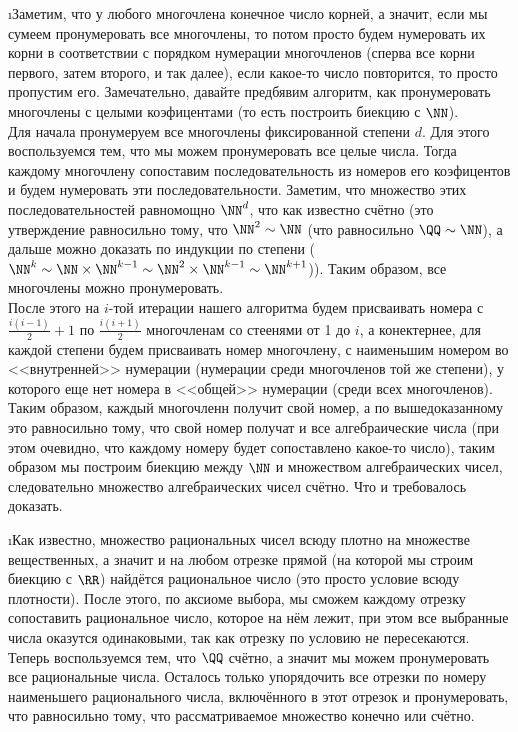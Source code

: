 \i Заметим, что у любого многочлена конечное число корней, а значит, если мы сумеем пронумеровать все многочлены, то потом просто будем нумеровать их корни в соответствии с порядком нумерации многочленов (сперва все корни первого, затем второго, и так далее), если какое-то число повторится, то просто пропустим его. Замечательно, давайте предбявим алгоритм, как пронумеровать многочлены с целыми коэфицентами (то есть построить биекцию с $\NN$).\\
Для начала пронумеруем все многочлены фиксированной степени $d$. Для этого воспользуемся тем, что мы можем пронумеровать все целые числа. Тогда каждому многочлену сопоставим последовательность из номеров его коэфицентов и будем нумеровать эти последовательности. Заметим, что множество этих последовательностей равномощно $\NN^d$, что как известно счётно (это утверждение равносильно тому, что $\NN^2 \sim \NN$ (что равносильно $\QQ \sim \NN$), а дальше можно доказать по индукции по степени ($\NN^k \sim \NN \times \NN^{k-1} \sim \NN^2 \times \NN^{k-1} \sim \NN^{k+1}$)). Таким образом, все многочлены можно пронумеровать.\\
После этого на $i$-той итерации нашего алгоритма будем присваивать номера с $\frac{i(i-1)}{2}+1$ по $\frac{i(i+1)}{2}$ многочленам со стеенями от 1 до $i$, а конектернее, для каждой степени будем присваивать номер многочлену, с наименьшим номером во <<внутренней>> нумерации (нумерации среди многочленов той же степени), у которого еще нет номера в <<общей>> нумерации (среди всех многочленов).\\
Таким образом, каждый многочленн получит свой номер, а по вышедоказанному это равносильно тому, что свой номер получат и все алгебраические числа (при этом очевидно, что каждому номеру будет сопоставлено какое-то число), таким образом мы построим биекцию между $\NN$ и множеством алгебраических чисел, следовательно множество алгебраических чисел счётно. Что и требовалось доказать.

\i Как известно, множество рациональных чисел всюду плотно на множестве вещественных, а значит и на любом отрезке прямой (на которой мы строим биекцию с $\RR$) найдётся рациональное число (это просто условие всюду плотности). После этого, по аксиоме выбора, мы сможем каждому отрезку сопоставить рациональное число, которое на нём лежит, при этом все выбранные числа оказутся одинаковыми, так как отрезку по условию не пересекаются.\\
Теперь воспользуемся тем, что $\QQ$ счётно, а значит мы можем пронумеровать все рациональные числа. Осталось только упорядочить все отрезки по номеру наименьшего рационального числа, включённого в этот отрезок и пронумеровать, что равносильно тому, что рассматриваемое множество конечно или счётно.

